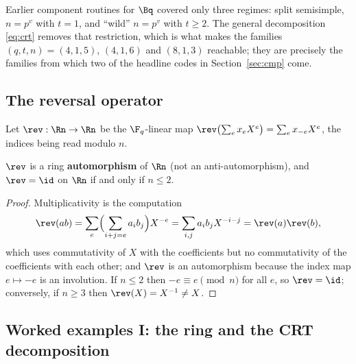 \begin{remark}[the CRT step is what opens $n=5,6$]
Earlier component routines for $\Bq$ covered only three regimes: split
semisimple, $n=p^v$ with $t=1$, and ``wild'' $n=p^v$ with $t\ge2$. The general
decomposition \eqref{eq:crt} removes that restriction, which is what makes the
families $(q,t,n)=(4,1,5)$, $(4,1,6)$ and $(8,1,3)$ reachable; they are
precisely the families from which two of the headline codes in
Section~\ref{sec:cmp} come.
\end{remark}

\subsection{The reversal operator}

\begin{definition}\label{def:rev}
Let $\rev:\Rn\to\Rn$ be the $\F_q$-linear map
$\rev\bigl(\sum_ex_eX^e\bigr)=\sum_ex_{-e}X^e$, the indices being read modulo
$n$.
\end{definition}

\begin{lemma}\label{lem:rev}
$\rev$ is a ring \textbf{automorphism} of $\Rn$ (not an anti-automorphism), and
$\rev=\id$ on $\Rn$ if and only if $n\le2$.
\end{lemma}

\begin{proof}
Multiplicativity is the computation
\[
  \rev(ab)=\sum_e\Bigl(\sum_{i+j=e}a_ib_j\Bigr)X^{-e}
  =\sum_{i,j}a_ib_jX^{-i-j}=\rev(a)\rev(b) ,
\]
which uses commutativity of $X$ with the coefficients but no commutativity of
the coefficients with each other; and $\rev$ is an automorphism because the
index map $e\mapsto -e$ is an involution. If $n\le2$ then
$-e\equiv e\pmod n$ for all $e$, so $\rev=\id$; conversely, if $n\ge3$ then
$\rev(X)=X^{-1}\ne X$.
\end{proof}

\subsection{Worked examples I: the ring and the CRT decomposition}

